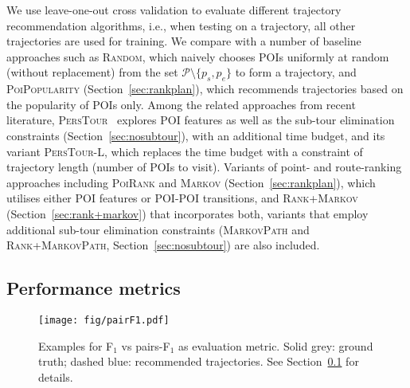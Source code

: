 We use leave-one-out cross validation to evaluate different trajectory recommendation algorithms,
i.e., when testing on a trajectory, all other trajectories are used for training.
We compare with a number of baseline approaches such as \textsc{Random}, 
which naively chooses POIs uniformly at random (without replacement) from the set $\mathcal{P} \setminus \{p_s, p_e \}$ to form a trajectory,
and \textsc{PoiPopularity} (Section~\ref{sec:rankplan}), which recommends trajectories based on the popularity of POIs only.
Among the related approaches from recent literature, 
\textsc{PersTour}~\cite{ijcai15} explores POI features as well as the sub-tour elimination constraints (Section~\ref{sec:nosubtour}), 
with an additional time budget, and its variant \textsc{PersTour-L}, 
which replaces the time budget with a constraint of trajectory length (number of POIs to visit).
Variants of point- and route-ranking approaches including \textsc{PoiRank} and \textsc{Markov} (Section~\ref{sec:rankplan}),
which utilises either POI features or POI-POI transitions,
and \textsc{Rank+Markov} (Section~\ref{sec:rank+markov}) that incorporates both, %
variants that employ additional sub-tour elimination constraints 
(\textsc{MarkovPath} and \textsc{Rank+MarkovPath}, Section~\ref{sec:nosubtour}) are also included.





\subsection{Performance metrics}
\label{sec:metric}
\secmoveup

\begin{figure}[t]
	\centering
	\texttt{[image: fig/pairF1.pdf]}
	\caption{Examples for F$_1$ vs pairs-F$_1$ as evaluation metric. 
Solid grey: ground truth; dashed blue: recommended trajectories. See Section~\ref{sec:metric} for details.}
	\label{fig:pairf1}\captionmoveup
\end{figure}

